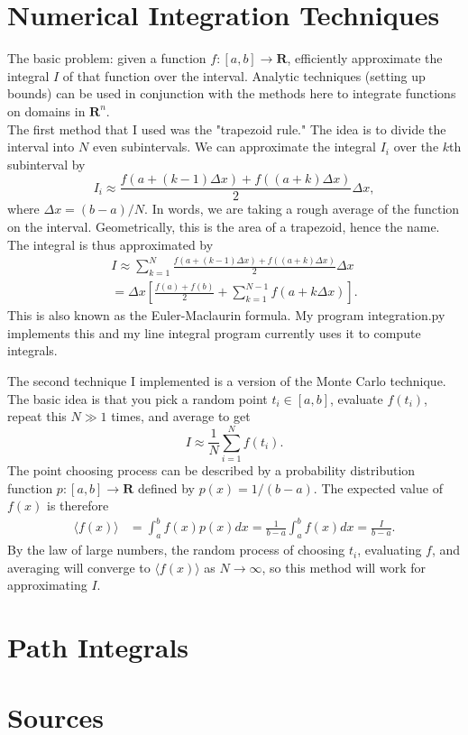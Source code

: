 \documentclass[11pt]{article}
\begin{document}
\section{Numerical Integration Techniques}
The basic problem: given a function $f:[a,b]\to\mathbf{R}$, efficiently approximate the integral $I$ of that function over the interval. Analytic techniques (setting up bounds) can be used in conjunction with the methods here to integrate functions on domains in $\mathbf{R}^n$.\\
\indent The first method that I used was the "trapezoid rule." The idea is to divide the interval into $N$ even subintervals. We can approximate the integral $I_i$ over the $k$th subinterval by
\begin{equation*}
	I_i \approx \frac{f(a+(k-1)\Delta x) + f((a+k)\Delta x)}{2}\Delta x,
\end{equation*}
where $\Delta x = (b-a)/N$. In words, we are taking a rough average of the function on the interval. Geometrically, this is the area of a trapezoid, hence the name. The integral is thus approximated by
\begin{align*}
	I \approx \sum_{k=1}^N \frac{f(a+(k-1)\Delta x) + f((a+k)\Delta x)}{2}\Delta x \\
	= \Delta x\left[\frac{f(a)+f(b)}{2} + \sum_{k=1}^{N-1} f(a + k\Delta x)\right].
\end{align*}
This is also known as the Euler-Maclaurin formula. My program integration.py implements this and my line integral program currently uses it to compute integrals. 
\par 
The second technique I implemented is a version of the Monte Carlo technique. The basic idea is that you pick a random point $t_i\in[a,b]$, evaluate $f(t_i)$, repeat this $N \gg 1$ times, and average to get
\begin{equation*}
	I \approx \frac{1}{N} \sum_{i=1}^N f(t_i).
\end{equation*}
The point choosing process can be described by a probability distribution function $p:[a,b]\to \mathbf{R}$ defined by $p(x) = 1/(b-a)$. The expected value of $f(x)$ is therefore 
\begin{align*}
	\langle f(x)\rangle &= \int_a^b f(x) p(x) dx = \frac{1}{b-a}\int_a^b f(x)dx = \frac{I}{b-a}.
\end{align*}
By the law of large numbers, the random process of choosing $t_i$, evaluating $f$, and averaging will converge to $\langle f(x)\rangle$ as $N\to\infty$, so this method will work for approximating $I$.
\section{Path Integrals}

\section{Sources}
\end{document}
